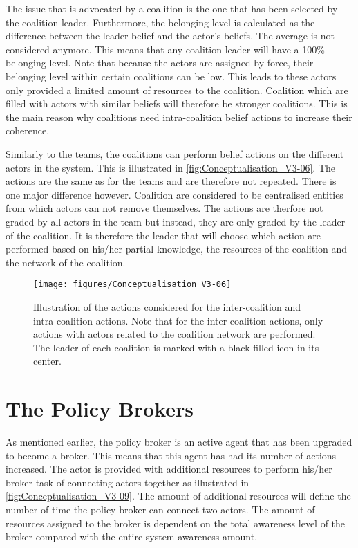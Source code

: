 The issue that is advocated by a coalition is the one that has been selected by the coalition leader. Furthermore, the belonging level is calculated as the difference between the leader belief and the actor's beliefs. The average is not considered anymore. This means that any coalition leader will have a 100\% belonging level. Note that because the actors are assigned by force, their belonging level within certain coalitions can be low. This leads to these actors only provided a limited amount of resources to the coalition. Coalition which are filled with actors with similar beliefs will therefore be stronger coalitions. This is the main reason why coalitions need intra-coalition belief actions to increase their coherence.

Similarly to the teams, the coalitions can perform belief actions on the different actors in the system. This is illustrated in \autoref{fig:Conceptualisation_V3-06}. The actions are the same as for the teams and are therefore not repeated. There is one major difference however. Coalition are considered to be centralised entities from which actors can not remove themselves. The actions are therfore not graded by all actors in the team but instead, they are only graded by the leader of the coalition. It is therefore the leader that will choose which action are performed based on his/her partial knowledge, the resources of the coalition and the network of the coalition.

\begin{figure}
\centering
\texttt{[image: figures/Conceptualisation\_V3-06]}
\caption{Illustration of the actions considered for the inter-coalition and intra-coalition actions. Note that for the inter-coalition actions, only actions with actors related to the coalition network are performed. The leader of each coalition is marked with a black filled icon in its center.}
\label{fig:Conceptualisation_V3-06}
\end{figure}

\section{The Policy Brokers}
\label{sec:policyBrokers}

As mentioned earlier, the policy broker is an active agent that has been upgraded to become a broker. This means that this agent has had its number of actions increased. The actor is provided with additional resources to perform his/her broker task of connecting actors together as illustrated in \autoref{fig:Conceptualisation_V3-09}. The amount of additional resources will define the number of time the policy broker can connect two actors. The amount of resources assigned to the broker is dependent on the total awareness level of the broker compared with the entire system awareness amount.

